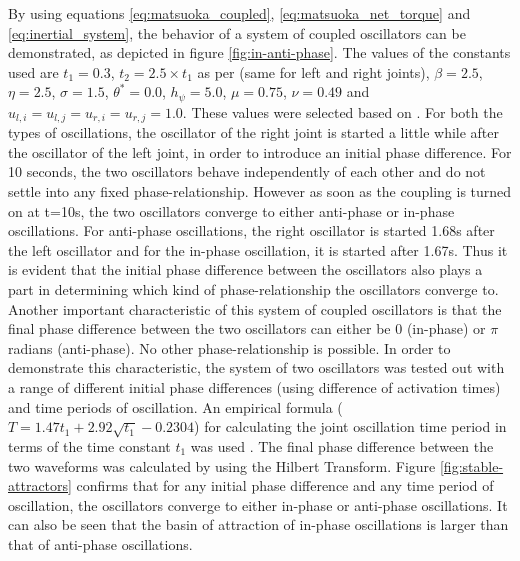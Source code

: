 \documentclass[12pt,twoside]{article}
\theoremstyle{plain}
\theoremstyle{definition}
\theoremstyle{remark}
\newcommand{\forceindent}{\leavevmode{\parindent=2em\indent}}
\begin{document}
\forceindent By using equations \ref{eq:matsuoka_coupled}, \ref{eq:matsuoka_net_torque} and  \ref{eq:inertial_system}, the behavior of a system of coupled oscillators can be demonstrated, as depicted in figure \ref{fig:in-anti-phase}. The values of the constants used are $t_1=0.3$, $t_2= 2.5 \times t_1$ as per \cite{Ronsse2009} (same for left and right joints), $\beta=2.5$,  $\eta=2.5$, $\sigma=1.5$, $\theta^*=0.0$, $h_{\psi}=5.0$, $\mu=0.75$, $\nu=0.49$ and $u_{l,i}=u_{l,j}=u_{r,i}=u_{r,j}=1.0$. These values were selected based on \cite{Ronsse2009}. For both the types of oscillations, the oscillator of the right joint is started a little while after the oscillator of the left joint, in order to introduce an initial phase difference. For 10 seconds, the two oscillators behave independently of each other and do not settle into any fixed phase-relationship. However as soon as the coupling is turned on at t=10s, the two oscillators converge to either anti-phase or in-phase oscillations. For anti-phase oscillations, the right oscillator is started 1.68s after the left oscillator and for the in-phase oscillation, it is started after 1.67s. Thus it is evident that the initial phase difference between the oscillators also plays a part in determining which kind of phase-relationship the oscillators converge to.\\
\forceindent Another important characteristic of this system of coupled oscillators is that the final phase difference between the two oscillators can either be 0 (in-phase) or $\pi$ radians (anti-phase). No other phase-relationship is possible. In order to demonstrate this characteristic, the system of two oscillators was tested out with a range of different initial phase differences (using difference of activation times) and time periods of oscillation. An empirical formula ($T=1.47t_1 + 2.92\sqrt{t_1} - 0.2304$) for calculating the joint oscillation time period in terms of the time constant $t_1$ was used \cite{Ronsse2009}. The final phase difference between the two waveforms was calculated by using the Hilbert Transform. Figure \ref{fig:stable-attractors} confirms that for any initial phase difference and any time period of oscillation, the oscillators converge to either in-phase or anti-phase oscillations. It can also be seen that the basin of attraction of in-phase oscillations is larger than that of anti-phase oscillations.
\end{document}
